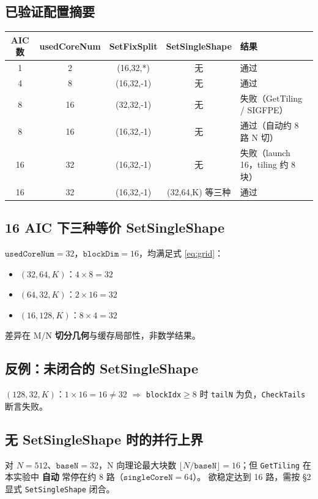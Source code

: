\documentclass[UTF8,a4paper,11pt]{ctexart}
\begin{document}
\subsection{已验证配置摘要}
\begin{table}[h]
  \centering
  \small
  \begin{tabular}{ccccp{4.5cm}}
    \toprule
    AIC 数 & usedCoreNum & SetFixSplit & SetSingleShape & 结果 \\
    \midrule
    1 & 2 & (16,32,*) & 无 & 通过 \\
    4 & 8 & (16,32,-1) & 无 & 通过 \\
    8 & 16 & (32,32,-1) & 无 & 失败（GetTiling / SIGFPE） \\
    8 & 16 & (16,32,-1) & 无 & 通过（自动约 8 路 N 切） \\
    16 & 32 & (16,32,-1) & 无 & 失败（launch 16，tiling 约 8 块） \\
    16 & 32 & (16,32,-1) & (32,64,K) 等三种 & 通过 \\
    \bottomrule
  \end{tabular}
\end{table}

\subsection{16 AIC 下三种等价 SetSingleShape}
$\texttt{usedCoreNum}=32$，$\texttt{blockDim}=16$，均满足式 \eqref{eq:grid}：
\begin{itemize}
  \item $(32,64,K)$：$4 \times 8 = 32$
  \item $(64,32,K)$：$2 \times 16 = 32$
  \item $(16,128,K)$：$8 \times 4 = 32$
\end{itemize}
差异在 M/N \textbf{切分几何}与缓存局部性，非数学结果。

\subsection{反例：未闭合的 SetSingleShape}
$(128,32,K)$：$1 \times 16 = 16 \neq 32$ $\Rightarrow$ \texttt{blockIdx}$\geq 8$ 时
\texttt{tailN} 为负，\texttt{CheckTails} 断言失败。

\subsection{无 SetSingleShape 时的并行上界}
对 $N=512$、$\texttt{baseN}=32$，N 向理论最大块数
$\lfloor N / \texttt{baseN} \rfloor = 16$；但 \texttt{GetTiling} 在
本实验中 \textbf{自动} 常停在约 8 路（$\texttt{singleCoreN}=64$）。
欲稳定达到 16 路，需按 §2 显式 \texttt{SetSingleShape} 闭合。
\end{document}
